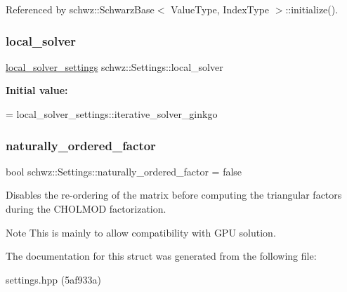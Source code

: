 Referenced by schwz\+::\+Schwarz\+Base$<$ Value\+Type, Index\+Type $>$\+::initialize().

\mbox{\label{structschwz_1_1Settings_a8028fcf029fadc07a7d1b9aa94c83f08}} 
\subsubsection{\texorpdfstring{local\+\_\+solver}{local\_solver}}
{\footnotesize\ttfamily \hyperlink{structschwz_1_1Settings_a31e82310ef6aed08168baef78f0db69e}{local\+\_\+solver\+\_\+settings} schwz\+::\+Settings\+::local\+\_\+solver}

{\bfseries Initial value\+:}
\begin{DoxyCode}
=
        local\_solver\_settings::iterative\_solver\_ginkgo
\end{DoxyCode}
\mbox{\label{structschwz_1_1Settings_a75a2ff3778c7334382a6c74553dbd5b4}} 
\subsubsection{\texorpdfstring{naturally\+\_\+ordered\+\_\+factor}{naturally\_ordered\_factor}}
{\footnotesize\ttfamily bool schwz\+::\+Settings\+::naturally\+\_\+ordered\+\_\+factor = false}



Disables the re-\/ordering of the matrix before computing the triangular factors during the C\+H\+O\+L\+M\+OD factorization. 

\begin{DoxyNote}{Note}
This is mainly to allow compatibility with G\+PU solution. 
\end{DoxyNote}


The documentation for this struct was generated from the following file\+:\begin{DoxyCompactItemize}
\item 
settings.\+hpp (5af933a)\end{DoxyCompactItemize}
